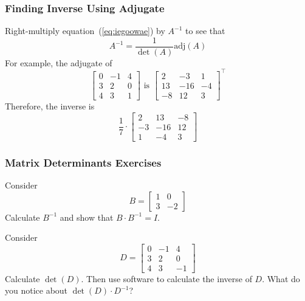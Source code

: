 \documentclass[xcolor=dvipsnames]{beamer}
\begin{document}
\begin{frame}
  \frametitle{Finding Inverse Using Adjugate}
  Right-multiply equation~(\ref{eq:iegoowae}) by $A^{-1}$ to see that
  \begin{equation}
    \label{eq:foomochu}
    A^{-1}=\frac{1}{\det(A)}\mbox{adj}(A)
  \end{equation}
  For example, the adjugate of
  \begin{equation}
    \label{eq:soojohdi}
    \left[
      \begin{array}{ccc}
        0 & -1 & 4 \\
        3 & 2 & 0 \\
        4 & 3 & 1 
      \end{array}\right]\mbox{ is }\left[
      \begin{array}{ccc}
        2 & -3 & 1 \\
        13 & -16 & -4 \\
        -8 & 12 & 3 
\end{array}\right]^{\intercal}
  \end{equation}
  Therefore, the inverse is
  \begin{equation}
    \label{eq:fiaphaid}
    \frac{1}{7}\cdot\left[
      \begin{array}{ccc}
        2 & 13 & -8 \\
        -3 & -16 & 12 \\
        1 & -4 & 3 
      \end{array}\right]
  \end{equation}
\end{frame}

\begin{frame}
  \frametitle{Matrix Determinants Exercises}  
  {\ubung} Consider
  \begin{equation}
    \label{eq:aengixoh}
    B=\left[
      \begin{array}{cc}
        1 & 0 \\
        3 & -2 
      \end{array}\right]
  \end{equation}
  Calculate $B^{-1}$ and show that $B\cdot{}B^{-1}=I$.

  \medskip

  {\ubung} Consider
  \begin{equation}
    \label{eq:eecheipo}
    D=\left[
      \begin{array}{ccc}
        0 & -1 & 4 \\
        3 & 2 & 0 \\
        4 & 3 & -1 
      \end{array}\right]
  \end{equation}
Calculate $\det(D)$. Then use software to calculate the inverse of
$D$. What do you notice about $\det(D)\cdot{}D^{-1}$?
\end{frame}
\end{document}
